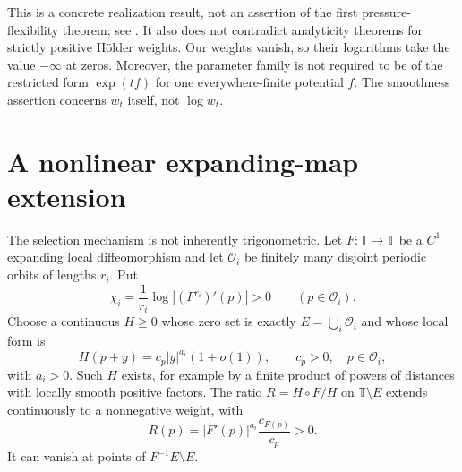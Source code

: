 \documentclass[11pt,a4paper]{article}
\numberwithin{equation}{section}
\theoremstyle{definition}
\theoremstyle{remark}
\newcommand{\TT}{\mathbb T}
\newcommand{\cO}{\mathcal O}
\begin{document}
This is a concrete realization result, not an assertion of the first
pressure-flexibility theorem; see \cite{KQ}. It also does not
contradict analyticity theorems for strictly positive H\"older weights.
Our weights vanish, so their logarithms take the value $-\infty$ at
zeros. Moreover, the parameter family is not required to be of the
restricted form $\exp(t f)$ for one everywhere-finite potential $f$.
The smoothness assertion concerns $w_t$ itself, not $\log w_t$.

\section{A nonlinear expanding-map extension}
\label{sec:nonlinear}
The selection mechanism is not inherently trigonometric. Let
$F\colon\TT\to\TT$ be a $C^1$ expanding local diffeomorphism and let
$\cO_i$ be finitely many disjoint periodic orbits of lengths $r_i$.
Put
\[
 \chi_i=\frac1{r_i}\log|(F^{r_i})'(p)|>0\qquad(p\in\cO_i).
\]
Choose a continuous $H\ge0$ whose zero set is exactly
$E=\bigcup_i\cO_i$ and whose local form is
\begin{equation}
 H(p+y)=c_p|y|^{a_i}(1+o(1)),\qquad c_p>0,
        \quad p\in\cO_i,
 \label{eq:nonlinear-H}
\end{equation}
with $a_i>0$. Such $H$ exists, for example by a finite product of
powers of distances with locally smooth positive factors.
The ratio $R=H\circ F/H$ on $\TT\setminus E$ extends continuously
to a nonnegative weight, with
\begin{equation}
 R(p)=|F'(p)|^{a_i}\frac{c_{F(p)}}{c_p}>0.
 \label{eq:nonlinear-R}
\end{equation}
It can vanish at points of $F^{-1}E\setminus E$.
\end{document}
